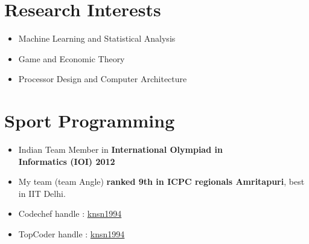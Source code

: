 \documentclass[10pt]{article} %
\begin{document}
{\begin{minipage}[t]{0.5\textwidth}
\section{Research Interests} 
\begin{itemize} \itemsep1pt
\item Machine Learning and Statistical Analysis
\item Game and Economic Theory
\item Processor Design and Computer Architecture
\end{itemize}
	

\section{Sport Programming} 
\begin{itemize} \itemsep1pt
\item Indian Team Member in {\bf International Olympiad in \\ Informatics (IOI) 2012}  
\item My team (team Angle) {\bf ranked 9th in ICPC regionals Amritapuri}, best in IIT Delhi.
\item Codechef handle : \href{http://www.codechef.com/users/knsn1994}{knsn1994}
\item TopCoder handle : \href{http://community.topcoder.com/tc?module=MemberProfile&cr=22917652}{knsn1994}
\end{itemize}



\end{minipage}}
\end{document}
